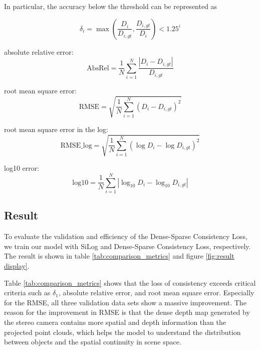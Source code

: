 \documentclass{article}
\begin{document}
        In particular, the accuracy below the threshold can be represented as

        \begin{equation}
            \delta_i =  \max\left(\frac{D_i}{D_{i, gt}}, \frac{D_{i, gt}}{D_i}\right) < 1.25^i 
        \end{equation}

       absolute relative error:
        \begin{equation}
            \text{AbsRel} = \frac{1}{N} \sum_{i=1}^{N} \frac{|D_i - D_{i, gt}|}{D_{i, gt}}
        \end{equation}

        root mean square error:
        \begin{equation}
            \text{RMSE} = \sqrt{\frac{1}{N} \sum_{i=1}^{N} (D_i - D_{i, gt})^2}
        \end{equation}

        root mean square error in the log:
        \begin{equation}
            \text{RMSE\_log} = \sqrt{\frac{1}{N} \sum_{i=1}^{N} \left(\log D_i - \log D_{i, gt}\right)^2}
        \end{equation}

        log10 error:
        \begin{equation}
            \text{log10} = \frac{1}{N} \sum_{i=1}^{N} \left| \log_{10} D_i - \log_{10} D_{i, gt} \right|
        \end{equation}

    \subsection{Result}
        To evaluate the validation and efficiency of the Dense-Sparse Consistency Loss, we train our model with SiLog and Dense-Sparse Consistency Loss, respectively. The result is shown in table \ref{tab:comparison_metrics} and figure \ref{fig:result display}.  

        Table \ref{tab:comparison_metrics} shows that the loss of consistency exceeds critical criteria such as $\delta_{1}$, absolute relative error, and root mean square error. Especially for the RMSE, all three validation data sets show a massive improvement. The reason for the improvement in RMSE is that the dense depth map generated by the stereo camera contains more spatial and depth information than the projected point clouds, which helps the model to understand the distribution between objects and the spatial continuity in scene space.
\end{document}
